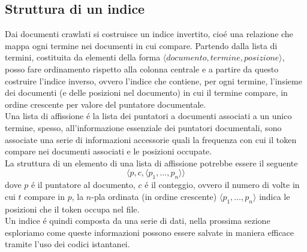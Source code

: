 \subsection{Struttura di un indice}
Dai documenti crawlati si costruisce un indice invertito, cioé una relazione che mappa ogni termine nei documenti in cui compare. Partendo dalla lista di termini, costituita da elementi della forma $\langle documento, termine, posizione \rangle$, posso fare ordinamento rispetto alla colonna centrale e a partire da questo costruire l'indice inverso, ovvero l'indice che contiene, per ogni termine, l'insieme dei documenti (e delle posizioni nel documento) in cui il termine compare, in ordine crescente per valore del puntatore documentale.\\
Una lista di affissione é la lista dei puntatori a documenti associati a un unico termine, spesso, all'informazione essenziale dei puntatori documentali, sono associate una serie di informazioni accessorie quali la frequenza con cui il token compare nei documenti associati e le posizioni occupate.\\
La struttura di un elemento di una lista di affissione potrebbe essere il seguente
\begin{equation*}
    \langle p, c, \langle p_1, \dots, p_n \rangle \rangle
\end{equation*} 
dove $p$ é il puntatore al documento, $c$ é il conteggio, ovvero il numero di volte in cui $t$ compare in $p$, la $n$-pla ordinata (in ordine crescente) $\langle p_1, \dots, p_n \rangle$ indica le posizioni che il token occupa nel file.\\
Un indice é quindi composta da una serie di dati, nella prossima sezione esploriamo come queste informazioni possono essere salvate in maniera efficace tramite l'uso dei codici istantanei.
